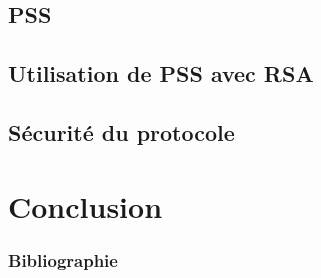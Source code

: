 \documentclass[12pt]{beamer}
\begin{document}
\subsection{PSS}
\begin{frame}
\transwipe

\end{frame}
\subsection{Utilisation de PSS avec RSA}
\begin{frame}
\transwipe

\end{frame}
\subsection{Sécurité du protocole}
\begin{frame}
\transwipe

\end{frame}
\section{Conclusion}
\begin{frame}
\transwipe

\end{frame}
\begin{frame}[shrink]
\frametitle{Bibliographie}
\nocite{*}


\end{frame}
\end{document}

